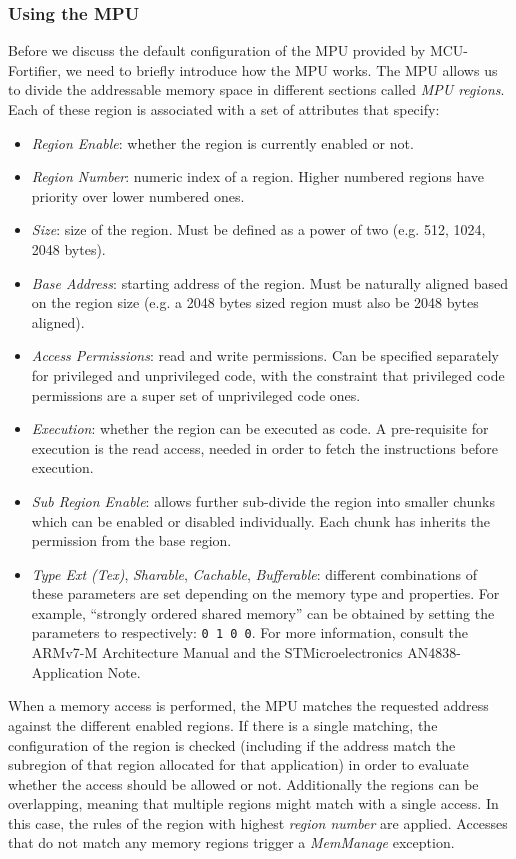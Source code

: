 \documentclass{article}
\begin{document}
\subsubsection{Using the MPU}
\label{subsubsec:using_mpu}
Before we discuss the default configuration of the MPU provided by MCU-Fortifier, we need to briefly introduce how the MPU works. The MPU allows us to divide the addressable memory space in different sections called \textit{MPU regions}. Each of these region is associated with a set of attributes that specify:
\begin{itemize}
	\item \textit{Region Enable}: whether the region is currently enabled or not.
	\item \textit{Region Number}: numeric index of a region. Higher numbered regions have priority over lower numbered ones.
	\item \textit{Size}: size of the region. Must be defined as a power of two (e.g. 512, 1024, 2048 bytes).
	\item \textit{Base Address}: starting address of the region. Must be naturally aligned based on the region size (e.g. a 2048 bytes sized region must also be 2048 bytes aligned).
	\item \textit{Access Permissions}: read and write permissions. Can be specified separately for privileged and unprivileged code, with the constraint that privileged code permissions are a super set of unprivileged code ones.
	\item \textit{Execution}: whether the region can be executed as code. A pre-requisite for execution is the read access, needed in order to fetch the instructions before execution.
	\item \textit{Sub Region Enable}: allows further sub-divide the region into smaller chunks which can be enabled or disabled individually. Each chunk has inherits the permission from the base region.
	\item \textit{Type Ext (Tex)}, \textit{Sharable}, \textit{Cachable}, \textit{Bufferable}: different combinations of these parameters are set depending on the memory type and properties. For example, ``strongly ordered shared memory'' can be obtained by setting the parameters to respectively: \verb|0 1 0 0|. For more information, consult the ARMv7-M Architecture Manual\cite{armv7m} and the STMicroelectronics AN4838-Application Note\cite{an4838}.
\end{itemize}

When a memory access is performed, the MPU matches the requested address against the different enabled regions. If there is a single matching, the configuration of the region is checked (including if the address match the subregion of that region allocated for that application) in order to evaluate whether the access should be allowed or not. Additionally the regions can be overlapping, meaning that multiple regions might match with a single access. In this case, the rules of the region with highest \textit{region number} are applied.
Accesses that do not match any memory regions trigger a \textit{MemManage} exception.
\end{document}
